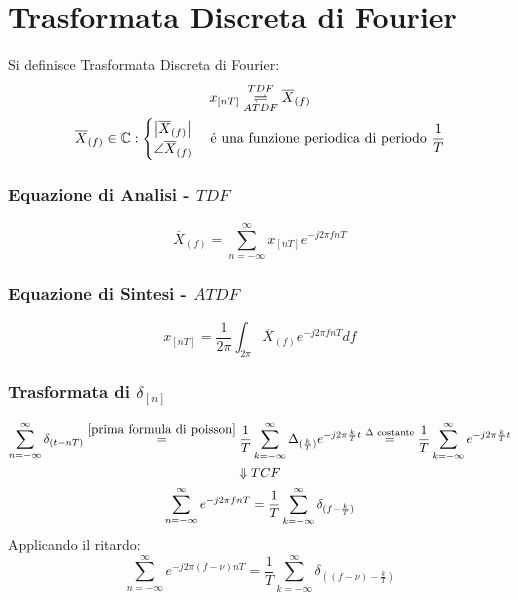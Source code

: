 \section{Trasformata Discreta di Fourier}
    Si definisce Trasformata Discreta di Fourier:
    \begin{gather}
        x_{[nT]} \overunderset{TDF}{ATDF}{\rightleftharpoons} \overline{X}_{(f)} \nonumber \\
        \overline{X}_{(f)} \in \mathbb{C}: \begin{cases}
            \left| \overline{X}_{(f)} \right| \nonumber \\
            \angle \overline{X}_{(f)} \nonumber
        \end{cases} \text{é una funzione periodica di periodo }\frac{1}{T}\nonumber  
    \end{gather}
    \subsubsection{Equazione di Analisi - $TDF$}
        \[
            \overline{X}_{(f)} = \sum_{n=-\infty}^{\infty} x_{[nT]}e^{-j2\pi fnT}
        \]
    \subsubsection{Equazione di Sintesi - $ATDF$}
        \[
            x_{[nT]} = \frac{1}{2\pi} \int_{2\pi} \overline{X}_{(f)}e^{-j2\pi fnT} df
        \]
    \subsubsection{Trasformata di $\delta_{[n]}$}\label{tdf sequenza di delta}
        \begin{gather}
            \sum_{n=-\infty}^{\infty}\delta_{(t-nT)} \overset{\ref{prima formula di poisson}}{=} \frac{1}{T} \sum_{k=-\infty}^{\infty} \Delta_{(\frac{k}{T})}e^{-j2\pi \frac{k}{T}t} \overset{\Delta \text{ costante}}{=} \frac{1}{T} \sum_{k=-\infty}^{\infty} e^{-j2\pi \frac{k}{T}t} \nonumber \\
            \Downarrow TCF\nonumber \\
            \sum_{n=-\infty}^{\infty}e^{-j2\pi fnT} = \frac{1}{T} \sum_{k=-\infty}^{\infty} \delta_{(f-\frac{k}{T})}\nonumber
        \end{gather}
        Applicando il ritardo:
        \[
            \sum_{n=-\infty}^{\infty}e^{-j2\pi (f-\nu)nT} = \frac{1}{T} \sum_{k=-\infty}^{\infty} \delta_{((f-\nu)-\frac{k}{T})}
        \]

